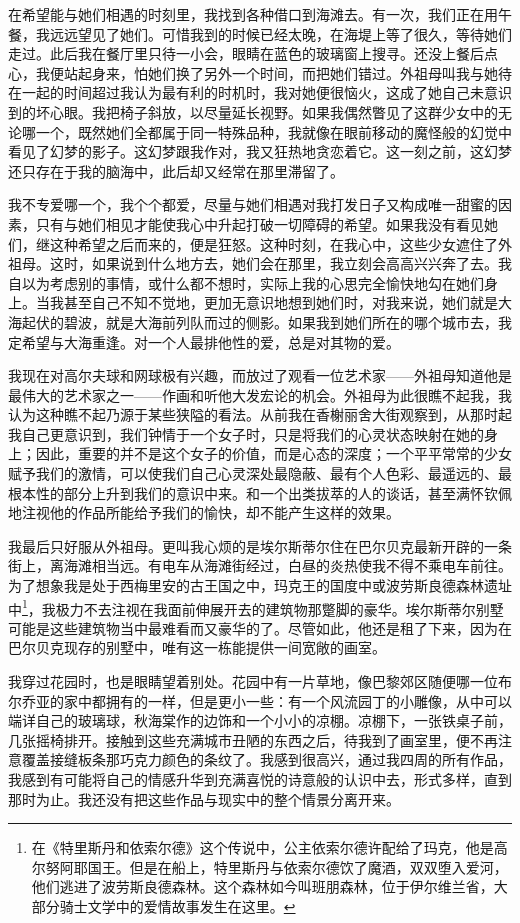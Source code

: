 \par 在希望能与她们相遇的时刻里，我找到各种借口到海滩去。有一次，我们正在用午餐，我远远望见了她们。可惜我到的时候已经太晚，在海堤上等了很久，等待她们走过。此后我在餐厅里只待一小会，眼睛在蓝色的玻璃窗上搜寻。还没上餐后点心，我便站起身来，怕她们换了另外一个时间，而把她们错过。外祖母叫我与她待在一起的时间超过我认为最有利的时机时，我对她便很恼火，这成了她自己未意识到的坏心眼。我把椅子斜放，以尽量延长视野。如果我偶然瞥见了这群少女中的无论哪一个，既然她们全都属于同一特殊品种，我就像在眼前移动的魔怪般的幻觉中看见了幻梦的影子。这幻梦跟我作对，我又狂热地贪恋着它。这一刻之前，这幻梦还只存在于我的脑海中，此后却又经常在那里滞留了。
\par 我不专爱哪一个，我个个都爱，尽量与她们相遇对我打发日子又构成唯一甜蜜的因素，只有与她们相见才能使我心中升起打破一切障碍的希望。如果我没有看见她们，继这种希望之后而来的，便是狂怒。这种时刻，在我心中，这些少女遮住了外祖母。这时，如果说到什么地方去，她们会在那里，我立刻会高高兴兴奔了去。我自以为考虑别的事情，或什么都不想时，实际上我的心思完全愉快地勾在她们身上。当我甚至自己不知不觉地，更加无意识地想到她们时，对我来说，她们就是大海起伏的碧波，就是大海前列队而过的侧影。如果我到她们所在的哪个城市去，我定希望与大海重逢。对一个人最排他性的爱，总是对其物的爱。
\par 我现在对高尔夫球和网球极有兴趣，而放过了观看一位艺术家——外祖母知道他是最伟大的艺术家之一——作画和听他大发宏论的机会。外祖母为此很瞧不起我，我认为这种瞧不起乃源于某些狭隘的看法。从前我在香榭丽舍大街观察到，从那时起我自己更意识到，我们钟情于一个女子时，只是将我们的心灵状态映射在她的身上；因此，重要的并不是这个女子的价值，而是心态的深度；一个平平常常的少女赋予我们的激情，可以使我们自己心灵深处最隐蔽、最有个人色彩、最遥远的、最根本性的部分上升到我们的意识中来。和一个出类拔萃的人的谈话，甚至满怀钦佩地注视他的作品所能给予我们的愉快，却不能产生这样的效果。
\par 我最后只好服从外祖母。更叫我心烦的是埃尔斯蒂尔住在巴尔贝克最新开辟的一条街上，离海滩相当远。有电车从海滩街经过，白昼的炎热使我不得不乘电车前往。为了想象我是处于西梅里安的古王国之中，玛克王的国度中或波劳斯良德森林遗址中\footnote{在《特里斯丹和依索尔德》这个传说中，公主依索尔德许配给了玛克，他是高尔努阿耶国王。但是在船上，特里斯丹与依索尔德饮了魔酒，双双堕入爱河，他们逃进了波劳斯良德森林。这个森林如今叫班朋森林，位于伊尔维兰省，大部分骑士文学中的爱情故事发生在这里。}，我极力不去注视在我面前伸展开去的建筑物那蹩脚的豪华。埃尔斯蒂尔别墅可能是这些建筑物当中最难看而又豪华的了。尽管如此，他还是租了下来，因为在巴尔贝克现存的别墅中，唯有这一栋能提供一间宽敞的画室。
\par 我穿过花园时，也是眼睛望着别处。花园中有一片草地，像巴黎郊区随便哪一位布尔乔亚的家中都拥有的一样，但是更小一些：有一个风流园丁的小雕像，从中可以端详自己的玻璃球，秋海棠作的边饰和一个小小的凉棚。凉棚下，一张铁桌子前，几张摇椅排开。接触到这些充满城市丑陋的东西之后，待我到了画室里，便不再注意覆盖接缝板条那巧克力颜色的条纹了。我感到很高兴，通过我四周的所有作品，我感到有可能将自己的情感升华到充满喜悦的诗意般的认识中去，形式多样，直到那时为止。我还没有把这些作品与现实中的整个情景分离开来。
